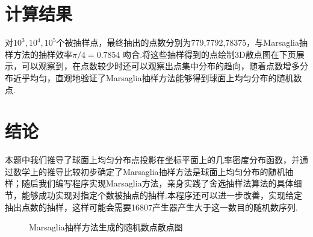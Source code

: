 \documentclass[12pt,a4paper,utf8]{ctexart}
\begin{document}
\section{计算结果}

对$10^3,10^4,10^5$个被抽样点，最终抽出的点数分别为779,7792,78375，与Marsaglia抽样方法的抽样效率$\pi/4
= 0.7854$
吻合.将这些抽样得到的点绘制3D散点图在下页展示，可以观察到，在点数较少时还可以观察出点集中分布的趋向，随着点数增多分布近乎均匀，直观地验证了Marsaglia抽样方法能够得到球面上均匀分布的随机数点.

\section{结论}

本题中我们推导了球面上均匀分布点投影在坐标平面上的几率密度分布函数，并通过数学上的推导比较初步确定了Marsaglia抽样方法是球面上均匀分布的随机抽样；随后我们编写程序实现Marsaglia方法，亲身实践了舍选抽样法算法的具体细节，能够成功实现对指定个数被抽点的抽样.本程序还可以进一步改善，实现给定抽出点数的抽样，这样可能会需要16807产生器产生大于这一数目的随机数序列.

\newpage

\begin{figure}[htb]
    \centering
     \hfill
     \hfill
    \caption{Marsaglia抽样方法生成的随机数点散点图}
\end{figure}
\end{document}
